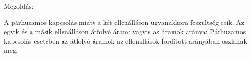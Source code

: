 
\ifdefined\megoldas

 Megoldás: 

 A párhuzamos kapcsolás miatt a két ellenálláson ugyanakkora feszültség esik. Az egyik és a másik ellenálláson átfolyó áram:
 vagyis az áramok aránya:
 Párhuzamos kapcsolás esetében az átfolyó áramok az ellenállások fordított arányában oszlanak meg.
 
\fi